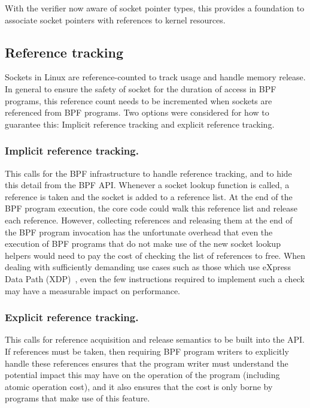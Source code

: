 \documentclass[10pt,sigconf,authorversion]{lpc}
\begin{document}
With the verifier now aware of socket pointer types, this provides a foundation
to associate socket pointers with references to kernel resources.

\subsection{Reference tracking}

Sockets in Linux are reference-counted to track usage and handle memory
release. In general to ensure the safety of socket for the duration of access
in BPF programs, this reference count needs to be incremented when sockets are
referenced from BPF programs. Two options were considered for how to guarantee
this: Implicit reference tracking and explicit reference tracking.


\subsubsection{Implicit reference tracking.}

This calls for the BPF infrastructure to handle reference tracking, and to hide
this detail from the BPF API. Whenever a socket lookup function is called, a
reference is taken and the socket is added to a reference list. At the end of
the BPF program execution, the core code could walk this reference list and
release each reference. However, collecting references and releasing them at
the end of the BPF program invocation has the unfortunate overhead that even
the execution of BPF programs that do not make use of the new socket lookup
helpers would need to pay the cost of checking the list of references to free.
When dealing with sufficiently demanding use cases such as those which use
eXpress Data Path (XDP)~\cite{xdp}, even the few instructions required to
implement such a check may have a measurable impact on performance.

\subsubsection{Explicit reference tracking.}

This calls for reference acquisition and release semantics to be built into the
API. If references must be taken, then requiring BPF program writers to
explicitly handle these references ensures that the program writer must
understand the potential impact this may have on the operation of the program
(including atomic operation cost), and it also ensures that the cost is only
borne by programs that make use of this feature.
\end{document}
